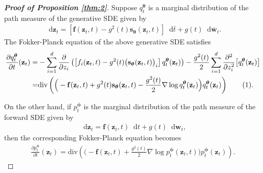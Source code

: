 \documentclass{article}
\theoremstyle{definition}
\theoremstyle{remark}
\newcommand\numberthis{\addtocounter{equation}{1}\tag{\theequation}}
\newcommand*\diff{\mathop{}\!\mathrm{d}}
\begin{document}
	\begin{proof}[\textbf{Proof of Proposition \ref{thm:2}}]
		Suppose $q_{t}^{\bm{\theta}}$ is a marginal distribution of the path measure of the generative SDE given by
		\begin{align}\label{eq:generative_latent_sde}
		\diff\mathbf{z}_{t}=\left[ \mathbf{f}(\mathbf{z}_{t},t)-g^{2}(t)\mathbf{s}_{\bm{\theta}}(\mathbf{z}_{t},t) \right]\diff \bar{t}+g(t)\diff\mathbf{\bar{w}}_{t}.
		\end{align}
		The Fokker-Planck equation of the above generative SDE satisfies
		\begin{align*}
		\frac{\partial q_{t}^{\bm{\theta}}}{\partial t}(\mathbf{z}_{t})=&-\sum_{i=1}^{d}\frac{\partial}{\partial z_{i}}\left(\left[ f_{i}(\mathbf{z}_{t},t)-g^{2}(t)\big(\mathbf{s}_{\bm{\theta}}(\mathbf{z}_{t},t)\big)_{i} \right]q_{t}^{\bm{\theta}}(\mathbf{z}_{t})\right)-\frac{g^{2}(t)}{2}\sum_{i=1}^{d}\frac{\partial^{2}}{\partial z_{i}^{2}}\big[q_{t}^{\bm{\theta}}(\mathbf{z}_{t})\big]\\
		=&\text{div}\left(\Big(-\mathbf{f}(\mathbf{z}_{t},t)+g^{2}(t)\mathbf{s}_{\bm{\theta}}(\mathbf{z}_{t},t)-\frac{g^{2}(t)}{2}\nabla \log{q_{t}^{\bm{\theta}}(\mathbf{z}_{t})}\Big)q_{t}^{\bm{\theta}}(\mathbf{z}_{t})\right)\numberthis\label{eq:generative_ode}.
		\end{align*}
		
		On the other hand, if $p_{t}^{\bm{\phi}}$ is the marginal distribution of the path measure of the forward SDE given by
		\begin{align*}
		\diff\mathbf{z}_{t}=\mathbf{f}(\mathbf{z}_{t},t)\diff t+g(t)\diff\mathbf{w}_{t},
		\end{align*}
		then the corresponding Fokker-Planck equation becomes
		\begin{align}\label{eq:reverse_ode}
		\frac{\partial p_{t}^{\bm{\phi}}}{\partial t}(\mathbf{z}_{t})=\text{div}\left( \Big(-\mathbf{f}(\mathbf{z}_{t},t)+\frac{g^{2}(t)}{2}\nabla \log{p_{t}^{\bm{\phi}}(\mathbf{z}_{t},t)}\Big)p_{t}^{\bm{\phi}}(\mathbf{z}_{t}) \right).
		\end{align}
		

\end{proof}
\end{document}
